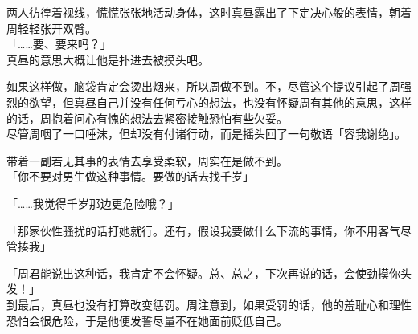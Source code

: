 两人彷徨着视线，慌慌张张地活动身体，这时真昼露出了下定决心般的表情，朝着周轻轻张开双臂。\\

「……要、要来吗？」\\

真昼的意思大概让他是扑进去被摸头吧。

如果这样做，脑袋肯定会烫出烟来，所以周做不到。不，尽管这个提议引起了周强烈的欲望，但真昼自己并没有任何亏心的想法，也没有怀疑周有其他的意思，这样的话，周抱着问心有愧的想法去紧密接触恐怕有些欠妥。\\

尽管周咽了一口唾沫，但却没有付诸行动，而是摇头回了一句敬语「容我谢绝」。

带着一副若无其事的表情去享受柔软，周实在是做不到。\\

「你不要对男生做这种事情。要做的话去找千岁」

「……我觉得千岁那边更危险哦？」

「那家伙性骚扰的话打她就行。还有，假设我要做什么下流的事情，你不用客气尽管揍我」

「周君能说出这种话，我肯定不会怀疑。总、总之，下次再说的话，会使劲摸你头发！」\\

到最后，真昼也没有打算改变惩罚。周注意到，如果受罚的话，他的羞耻心和理性恐怕会很危险，于是他便发誓尽量不在她面前贬低自己。
